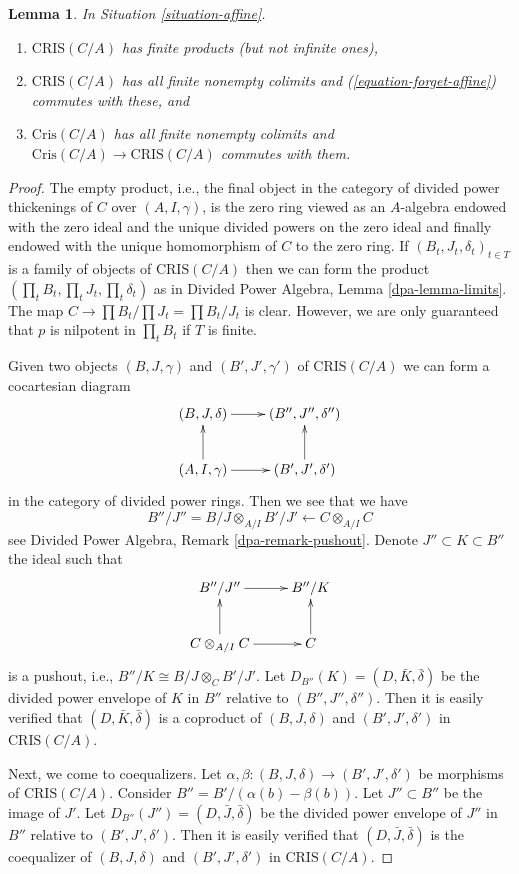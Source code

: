 \documentclass{stacks-project}
\theoremstyle{plain}
\newtheorem{lemma}[subsection]{Lemma}
\theoremstyle{definition}
\theoremstyle{remark}
\numberwithin{equation}{subsection}
\begin{document}
\begin{lemma}
\label{lemma-affine-thickenings-colimits}
In Situation \ref{situation-affine}.
\begin{enumerate}
\item $\text{CRIS}(C/A)$ has finite products (but not infinite ones),
\item $\text{CRIS}(C/A)$ has all finite nonempty colimits and
(\ref{equation-forget-affine}) commutes with these, and
\item $\text{Cris}(C/A)$ has all finite nonempty colimits and
$\text{Cris}(C/A) \to \text{CRIS}(C/A)$ commutes with them.
\end{enumerate}
\end{lemma}

\begin{proof}
The empty product, i.e., the final object in the category of divided
power thickenings of $C$ over $(A, I, \gamma)$, is the zero ring viewed
as an $A$-algebra endowed with the zero ideal and the unique divided powers
on the zero ideal and finally endowed with the unique homomorphism of $C$ to
the zero ring. If $(B_t, J_t, \delta_t)_{t \in T}$ is a family of objects of
$\text{CRIS}(C/A)$ then we can form the product
$(\prod_t B_t, \prod_t J_t, \prod_t \delta_t)$ as in
Divided Power Algebra, Lemma \ref{dpa-lemma-limits}.
The map $C \to \prod B_t/\prod J_t = \prod B_t/J_t$ is clear.
However, we are only guaranteed that $p$ is nilpotent in $\prod_t B_t$
if $T$ is finite.

\medskip\noindent
Given two objects $(B, J, \gamma)$ and $(B', J', \gamma')$ of
$\text{CRIS}(C/A)$ we can form a cocartesian diagram
$$
\xymatrix{
(B, J, \delta) \ar[r] & (B'', J'', \delta'') \\
(A, I, \gamma) \ar[r] \ar[u] & (B', J', \delta') \ar[u]
}
$$
in the category of divided power rings. Then we see that we have
$$
B''/J'' = B/J \otimes_{A/I} B'/J' \longleftarrow C \otimes_{A/I} C
$$
see Divided Power Algebra, Remark \ref{dpa-remark-pushout}.
Denote $J'' \subset K \subset B''$
the ideal such that
$$
\xymatrix{
B''/J'' \ar[r] & B''/K \\
C \otimes_{A/I} C \ar[r] \ar[u] & C \ar[u]
}
$$
is a pushout, i.e., $B''/K \cong B/J \otimes_C B'/J'$.
Let $D_{B''}(K) = (D, \bar K, \bar \delta)$
be the divided power envelope of $K$ in $B''$ relative to
$(B'', J'', \delta'')$. Then it is easily verified that
$(D, \bar K, \bar \delta)$ is a coproduct of $(B, J, \delta)$ and
$(B', J', \delta')$ in $\text{CRIS}(C/A)$.

\medskip\noindent
Next, we come to coequalizers. Let
$\alpha, \beta : (B, J, \delta) \to (B', J', \delta')$ be morphisms of
$\text{CRIS}(C/A)$. Consider $B'' = B'/ (\alpha(b) - \beta(b))$. Let
$J'' \subset B''$ be the image of $J'$. Let
$D_{B''}(J'') = (D, \bar J, \bar\delta)$ be the divided power envelope of
$J''$ in $B''$ relative to $(B', J', \delta')$. Then it is easily verified
that $(D, \bar J, \bar \delta)$ is the coequalizer of $(B, J, \delta)$ and
$(B', J', \delta')$ in $\text{CRIS}(C/A)$.


\end{proof}
\end{document}
